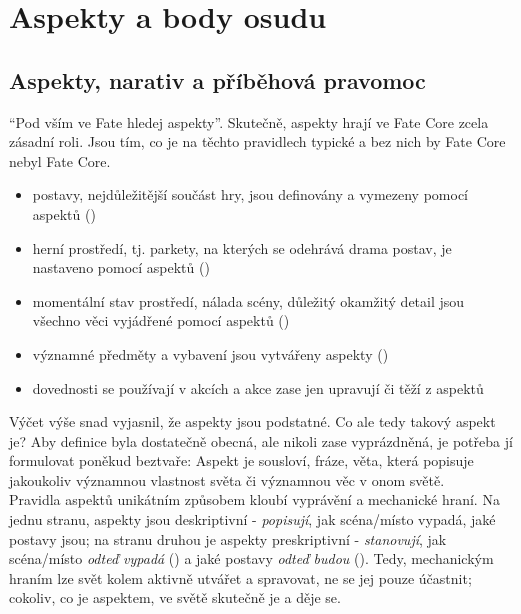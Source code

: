 \chapter{Aspekty a body osudu}
\label{chap:aspekty}

\section{Aspekty, narativ a příběhová pravomoc}
\label{sec:aspekty-narativ-pribeh}

``Pod vším ve Fate hledej aspekty''. Skutečně, aspekty hrají ve Fate Core zcela zásadní roli. Jsou tím, co je na těchto pravidlech typické a bez nich by Fate Core nebyl Fate Core.

\begin{itemize}
\item postavy, nejdůležitější součást hry, jsou definovány a vymezeny pomocí aspektů ()
\item herní prostředí, tj. parkety, na kterých se odehrává drama postav, je nastaveno pomocí aspektů ()
\item momentální stav prostředí, nálada scény, důležitý okamžitý detail jsou všechno věci vyjádřené pomocí aspektů ()
\item významné předměty a vybavení jsou vytvářeny aspekty ()
\item dovednosti se používají v akcích a akce zase jen upravují či těží z aspektů
\end{itemize}

Výčet výše snad vyjasnil, že aspekty jsou podstatné. Co ale tedy takový aspekt je? Aby definice byla dostatečně obecná, ale nikoli zase vyprázdněná, je potřeba jí formulovat poněkud beztvaře: Aspekt je sousloví, fráze, věta, která popisuje jakoukoliv významnou vlastnost světa či významnou věc v onom světě. \\

Pravidla aspektů unikátním způsobem kloubí vyprávění a mechanické hraní. Na jednu stranu, aspekty jsou deskriptivní - \textit{popisují}, jak scéna/místo vypadá, jaké postavy jsou; na stranu druhou je aspekty preskriptivní - \textit{stanovují}, jak scéna/místo \textit{odteď vypadá} () a jaké postavy \textit{odteď budou} (). Tedy, mechanickým hraním lze svět kolem aktivně utvářet a spravovat, ne se jej pouze účastnit; cokoliv, co je aspektem, ve světě skutečně je a děje se. \\

